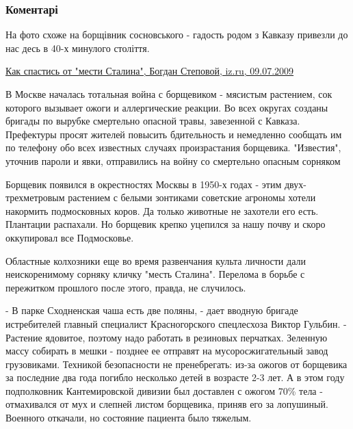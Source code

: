  
 
 
 
 
\subsubsection{Коментарі}

\begin{itemize} %


На фото схоже на борщівник сосновського - гадость родом з Кавказу привезли до
нас десь в 40-х минулого століття.

\href{https://iz.ru/news/350529}{%
Как спастись от "мести Сталина", Богдан Степовой, iz.ru, 09.07.2009%
}

\begin{multicols}{2}
В Москве началась тотальная война с борщевиком - мясистым растением, сок
которого вызывает ожоги и аллергические реакции. Во всех округах созданы
бригады по вырубке смертельно опасной травы, завезенной с Кавказа. Префектуры
просят жителей повысить бдительность и немедленно сообщать им по телефону обо
всех известных случаях произрастания борщевика. "Известия", уточнив пароли и
явки, отправились на войну со смертельно опасным сорняком

Борщевик появился в окрестностях Москвы в 1950-х годах - этим двух-трехметровым
растением с белыми зонтиками советские агрономы хотели накормить подмосковных
коров. Да только животные не захотели его есть. Плантации распахали. Но
борщевик крепко уцепился за нашу почву и скоро оккупировал все Подмосковье.

Областные колхозники еще во время развенчания культа личности дали
неискоренимому сорняку кличку "месть Сталина". Перелома в борьбе с пережитком
прошлого после этого, правда, не случилось.

- В парке Сходненская чаша есть две поляны, - дает вводную бригаде истребителей
главный специалист Красногорского спецлесхоза Виктор Гульбин. - Растение
ядовитое, поэтому надо работать в резиновых перчатках. Зеленную массу собирать
в мешки - позднее ее отправят на мусоросжигательный завод грузовиками. Техникой
безопасности не пренебрегать: из-за ожогов от борщевика за последние два года
погибло несколько детей в возрасте 2-3 лет. А в этом году подполковник
Кантемировской дивизии был доставлен с ожогом 70\% тела - отмахивался от мух и
слепней листом борщевика, приняв его за лопушиный. Военного откачали, но
состояние пациента было тяжелым.


\end{multicols}
\end{itemize}
